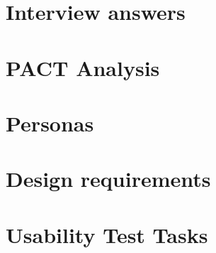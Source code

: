 \chapter{Interview answers}


\chapter{PACT Analysis}






\chapter{Personas} \label{PersonasAppendix}


\chapter{Design requirements} \label{RequirementsAppendix}


\chapter{Usability Test Tasks}
